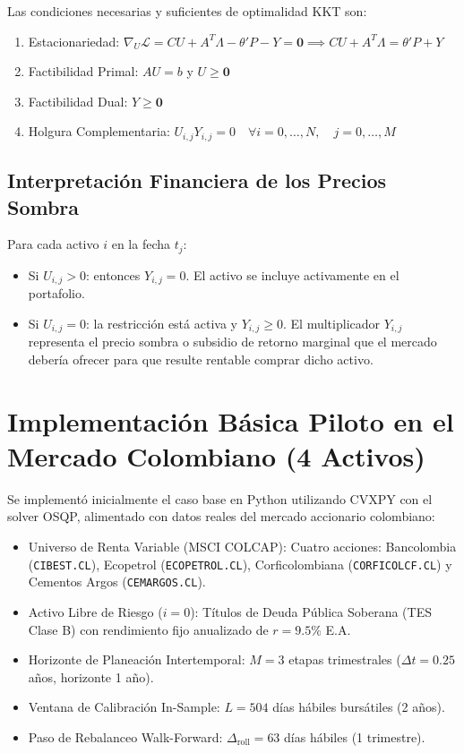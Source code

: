 \documentclass[11pt,a4paper]{article}
\begin{document}
Las condiciones necesarias y suficientes de optimalidad KKT son:
\begin{enumerate}
    \item Estacionariedad: $\nabla_U \mathcal{L} = CU + A^T \Lambda - \theta' P - Y = \mathbf{0} \implies CU + A^T \Lambda = \theta' P + Y$
    \item Factibilidad Primal: $AU = b$ y $U \ge \mathbf{0}$
    \item Factibilidad Dual: $Y \ge \mathbf{0}$
    \item Holgura Complementaria: $U_{i,j} Y_{i,j} = 0 \quad \forall i = 0, \dots, N, \quad j = 0, \dots, M$
\end{enumerate}

\subsection{Interpretación Financiera de los Precios Sombra}
Para cada activo $i$ en la fecha $t_j$:
\begin{itemize}
    \item Si $U_{i,j} > 0$: entonces $Y_{i,j} = 0$. El activo se incluye activamente en el portafolio.
    \item Si $U_{i,j} = 0$: la restricción está activa y $Y_{i,j} \ge 0$. El multiplicador $Y_{i,j}$ representa el precio sombra o subsidio de retorno marginal que el mercado debería ofrecer para que resulte rentable comprar dicho activo.
\end{itemize}

\section{Implementación Básica Piloto en el Mercado Colombiano (4 Activos)}

Se implementó inicialmente el caso base en Python utilizando CVXPY con el solver OSQP, alimentado con datos reales del mercado accionario colombiano:
\begin{itemize}
    \item Universo de Renta Variable (MSCI COLCAP): Cuatro acciones: Bancolombia (\texttt{CIBEST.CL}), Ecopetrol (\texttt{ECOPETROL.CL}), Corficolombiana (\texttt{CORFICOLCF.CL}) y Cementos Argos (\texttt{CEMARGOS.CL}).
    \item Activo Libre de Riesgo ($i=0$): Títulos de Deuda Pública Soberana (TES Clase B) con rendimiento fijo anualizado de $r = 9.5\%$ E.A.
    \item Horizonte de Planeación Intertemporal: $M = 3$ etapas trimestrales ($\Delta t = 0.25$ años, horizonte 1 año).
    \item Ventana de Calibración In-Sample: $L = 504$ días hábiles bursátiles (2 años).
    \item Paso de Rebalanceo Walk-Forward: $\Delta_{\mathrm{roll}} = 63$ días hábiles (1 trimestre).
\end{itemize}
\end{document}
